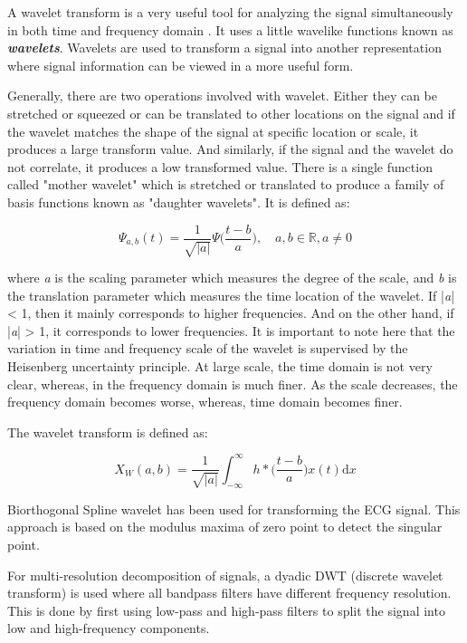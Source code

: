 A wavelet transform is a very useful tool for analyzing the signal simultaneously in both time and frequency domain \cite{addison2017illustrated}. It uses a little wavelike functions known as \textbf{\textit{wavelets}}. Wavelets are used to transform a signal into another representation where signal information can be viewed in a more useful form.

Generally, there are two operations involved with wavelet. Either they can be stretched or squeezed or can be translated to other locations on the signal and if the wavelet matches the shape of the signal at specific location or scale, it produces a large transform value. And similarly, if the signal and the wavelet do not correlate, it produces a low transformed value. There is a single function called "mother wavelet" which is stretched or translated to produce a family of basis functions known as "daughter wavelets". It is defined as:

\begin{equation} \label{eqn_mother_wavelet}
{\Psi_{a,b}(t) = \frac{1}{\sqrt{|a|}}\Psi \bigg(\frac{t-b}{a}\bigg),\quad a, b \in \mathbb{R}, a \neq 0}
\end{equation}

where \textit{a} is the scaling parameter which measures the degree of the scale, and \textit{b} is the translation parameter which measures the time location of the wavelet. If |\textit{a}| < 1, then it mainly corresponds to higher frequencies. And on the other hand, if |\textit{a}| > 1, it corresponds to lower frequencies. It is important to note here that the variation in time and frequency scale of the wavelet is supervised by the Heisenberg uncertainty principle. At large scale, the time domain is not very clear, whereas, in the frequency domain is much finer. As the scale decreases, the frequency domain becomes worse, whereas, time domain becomes finer.

The wavelet transform is defined as:

\begin{equation} \label{eqn_wavelet_transform}
{X_{W}(a, b) = \frac{1}{\sqrt{|a|}} \int_{-\infty}^\infty h*\bigg(\frac{t-b}{a}\bigg)x(t) \mathrm{d}x}
\end{equation}


Biorthogonal Spline wavelet has been used for transforming the ECG signal. This approach is based on the modulus maxima of zero point to detect the singular point. 


For multi-resolution decomposition of signals, a dyadic DWT (discrete wavelet transform) is used where all bandpass filters have different frequency resolution. This is done by first using low-pass and high-pass filters to split the signal into low and high-frequency components.

